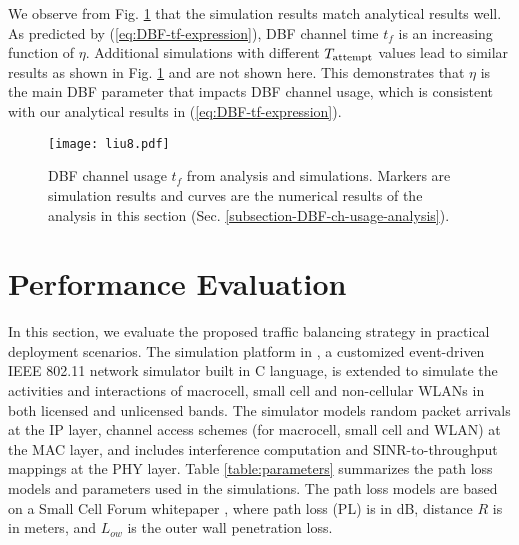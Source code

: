 \documentclass[journal,final,letterpaper,10pt,doublecolumn,twoside]{IEEEtran}
\begin{document}
We observe from  Fig. \ref{fig:DBF-sim} that the simulation results
match analytical results well. As predicted by
(\ref{eq:DBF-tf-expression}), DBF channel time $t_f$ is an
increasing function of $\eta$.
Additional simulations with different $T_{\textmd{attempt}}$ values lead to
similar results as shown in Fig.
\ref{fig:DBF-sim} and are not shown here. This demonstrates that
$\eta$ is the main DBF parameter that impacts DBF channel usage, which is consistent with our analytical results
in (\ref{eq:DBF-tf-expression}).




\begin{figure}
  \center
  \texttt{[image: liu8.pdf]}
  \caption{DBF channel usage $t_f$ from analysis and simulations.
  Markers are simulation results and curves are the numerical
  results of the analysis in this section (Sec. \ref{subsection-DBF-ch-usage-analysis}). }  \label{fig:DBF-sim}
\end{figure}




\section{Performance Evaluation}\label{sec:Femto-system-simulations}

In this section, we evaluate the proposed traffic balancing strategy
in practical deployment scenarios. The simulation platform in
\cite{CoopMAC_WirelessMag2006}\cite{EqualAccess_CoopMAC_Jsac2007}, a
customized event-driven IEEE 802.11 network simulator built in C
language, is extended to simulate the activities and interactions of
macrocell,  small cell and non-cellular WLANs in both licensed and
unlicensed bands. The simulator models random packet arrivals at the
IP layer, channel access schemes (for macrocell, small cell and
WLAN) at the MAC layer, and includes interference computation and
SINR-to-throughput mappings at the PHY layer. Table
\ref{table:parameters} summarizes the path loss models and
parameters used in the simulations. The path loss models are based
on a Small Cell Forum whitepaper \cite{femto-forum-whitepaper}, where
path loss (PL) is in dB, distance $R$ is  in meters, and $L_{ow}$ is
the outer wall penetration loss.
\end{document}
